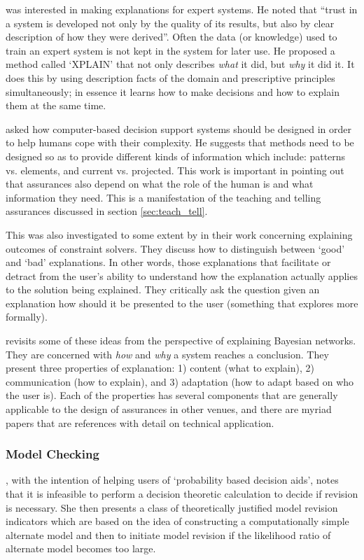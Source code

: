     \citet{Swartout1983-ko} was interested in making explanations for expert systems. He noted that ``trust in a system is developed not only by the quality of its results, but also by clear description of how they were derived''. Often the data (or knowledge) used to train an expert system is not kept in the system for later use. He proposed a method called `XPLAIN' that not only describes \emph{what} it did, but \emph{why} it did it. It does this by using description facts of the domain and prescriptive principles simultaneously; in essence it learns how to make decisions and how to explain them at the same time.

    \citet{Rouse1986-dz} asked how computer-based decision support systems should be designed in order to help humans cope with their complexity. He suggests that methods need to be designed so as to provide different kinds of information which include: patterns vs. elements, and current vs. projected. This work is important in pointing out that assurances also depend on what the role of the human is and what information they need. This is a manifestation of the teaching and telling assurances discussed in section \ref{sec:teach_tell}.

    This was also investigated to some extent by \citet{Wallace2001-fm} in their work concerning explaining outcomes of constraint solvers. They discuss how to distinguish between `good' and `bad' explanations. In other words, those explanations that facilitate or detract from the user's ability to understand how the explanation actually applies to the solution being explained. They critically ask the question given an explanation how should it be presented to the user (something that \citet{Kuhn1997-qc} explores more formally).

    \citet{Lacave2002-cu} revisits some of these ideas from the perspective of explaining Bayesian networks. They are concerned with \emph{how} and \emph{why} a system reaches a conclusion. They present three properties of explanation: 1) content (what to explain), 2) communication (how to explain), and 3) adaptation (how to adapt based on who the user is). Each of the properties has several components that are generally applicable to the design of assurances in other venues, and there are myriad papers that are references with detail on technical application.


\subsubsection{Model Checking}
    \citet{Laskey1991-mf}, with the intention of helping users of `probability based decision aids', notes that it is infeasible to perform a decision theoretic calculation to decide if revision is necessary. She then presents a class of theoretically justified model revision indicators which are based on the idea of constructing a computationally simple alternate model and then to initiate model revision if the likelihood ratio of alternate model becomes too large.

